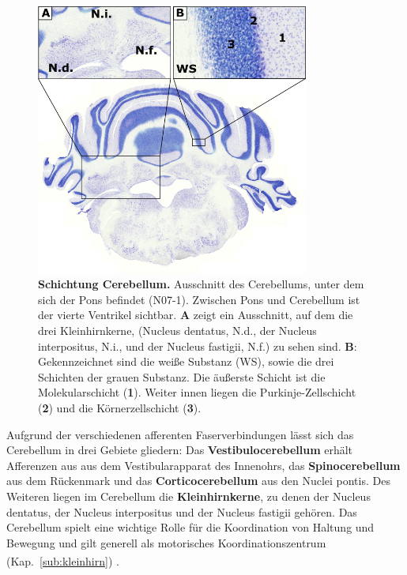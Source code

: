 \begin{figure}[H]
    \centering
    \includegraphics[width=0.8\textwidth]{pictures/Bilder_Jule/Ratte/cerebellum.png}
    \caption[Kleinhirnkerne und Schichtung des Cerebellum]{\textbf{Schichtung Cerebellum.} Ausschnitt des Cerebellums, unter dem sich der Pons befindet (N07-1). Zwischen Pons und Cerebellum ist der vierte Ventrikel sichtbar. \textbf{A} zeigt ein Ausschnitt, auf dem die drei Kleinhirnkerne, (Nucleus dentatus, N.d., der Nucleus interpositus, N.i., und der Nucleus fastigii, N.f.) zu sehen sind. \textbf{B}: Gekennzeichnet sind die weiße Substanz (WS), sowie die drei Schichten der grauen Substanz. Die äußerste Schicht ist die Molekularschicht (\textbf{1}). Weiter innen liegen die Purkinje-Zellschicht (\textbf{2}) und die Körnerzellschicht (\textbf{3}).}
    \label{fig:cerebellum_ratte}
\end{figure}

\noindent Aufgrund der verschiedenen afferenten Faserverbindungen lässt sich das Cerebellum in drei Gebiete gliedern: Das \textbf{Vestibulocerebellum} erhält Afferenzen aus aus dem Vestibularapparat des Innenohrs, das \textbf{Spinocerebellum} aus dem Rückenmark und das \textbf{Corticocerebellum} aus den Nuclei pontis. Des Weiteren liegen im Cerebellum die \textbf{Kleinhirnkerne}, zu denen der Nucleus dentatus, der Nucleus interpositus und der Nucleus fastigii gehören. Das Cerebellum spielt eine wichtige Rolle für die Koordination von Haltung und Bewegung und gilt generell als motorisches Koordinationszentrum (Kap.~\ref{sub:kleinhirn}) \textsuperscript{\cite[Kap.~7]{trepel2011neuroanatomie}}.
